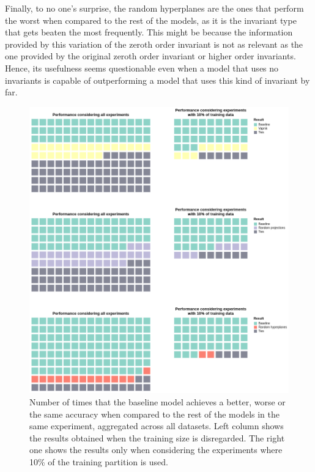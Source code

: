 Finally, to no one's surprise, the random hyperplanes are the ones that perform the worst when compared to the
rest of the models, as it is the invariant type that gets beaten the most frequently. This might be because the
information provided by this variation of the zeroth order invariant is not as relevant as the one provided by
the original zeroth order invariant or higher order invariants. Hence, its usefulness seems questionable even
when a model that uses no invariants is capable of outperforming a model that uses this kind
of invariant by far.

\begin{figure}[ht]
    \centering
    \includegraphics[width=\textwidth]{thesis/Figures/invariants_performance_1.png}
    \caption{Number of times that the baseline model achieves a better, worse or the same
    accuracy when compared to the rest of the models in the same experiment,
    aggregated across all datasets. Left column shows the results obtained when the training size is disregarded.
    The right one shows the results only when considering the experiments where 10\% of the training partition
    is used.}
    \label{fig:invariants_performance_1}
\end{figure}

